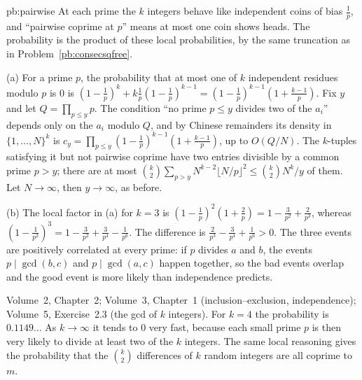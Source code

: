 \begin{solution}{pb:pairwise}
\idea At each prime the $k$ integers behave like independent coins of bias $\frac1p$, and ``pairwise coprime at $p$'' means at
most one coin shows heads. The probability is the product of these local probabilities, by the same truncation as in
Problem~\ref{pb:consecsqfree}.

\writeup (a) For a prime $p$, the probability that at most one of $k$ independent residues modulo $p$ is $0$ is
$(1-\frac1p)^k+k\frac1p(1-\frac1p)^{k-1}=(1-\frac1p)^{k-1}(1+\frac{k-1}p)$. Fix $y$ and let $Q=\prod_{p\le y}p$. The condition ``no
prime $p\le y$ divides two of the $a_i$'' depends only on the $a_i$ modulo $Q$, and by Chinese remainders its density in
$\{1,\dots,N\}^k$ is $c_y=\prod_{p\le y}(1-\frac1p)^{k-1}(1+\frac{k-1}p)$, up to $O(Q/N)$. The $k$-tuples satisfying it but not
pairwise coprime have two entries divisible by a common prime $p>y$; there are at most
$\binom k2\sum_{p>y}N^{k-2}\lfloor N/p\rfloor^2\le\binom k2N^k/y$ of them. Let $N\to\infty$, then $y\to\infty$, as before.

(b) The local factor in (a) for $k=3$ is $(1-\frac1p)^2(1+\frac2p)=1-\frac3{p^2}+\frac2{p^3}$, whereas $(1-\frac1{p^2})^3=1-\frac3{p^2}+\frac3{p^4}-\frac1{p^6}$.
The difference is $\frac2{p^3}-\frac3{p^4}+\frac1{p^6}>0$. The three events are positively correlated at every prime: if $p$
divides $a$ and $b$, the events $p\mid\gcd(b,c)$ and $p\mid\gcd(a,c)$ happen together, so the bad events overlap and the good
event is more likely than independence predicts.

\tools Volume~2, Chapter~2; Volume~3, Chapter~1 (inclusion--exclusion, independence); Volume~5, Exercise~2.3 (the gcd of $k$ integers).
\leads For $k=4$ the probability is $0.1149\ldots$ As $k\to\infty$ it tends to $0$ very fast, because each small prime
$p$ is then very likely to divide at least two of the $k$ integers. The same local reasoning gives the probability that
the $\binom k2$ differences of $k$ random integers are all coprime to $m$.
\end{solution}


